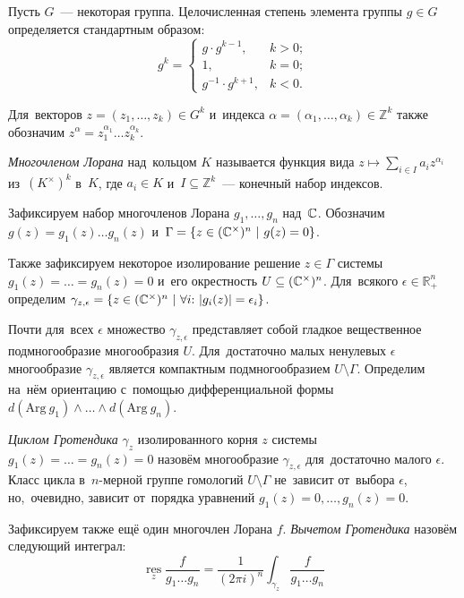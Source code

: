 \documentclass{article}
\begin{document}
Пусть $G$~— некоторая группа. Целочисленная степень элемента группы $g \in G$ определяется стандартным образом:
$$
  g^k =
  \begin{cases}
    g \cdot g^{k - 1}, & k > 0; \\
    1, & k = 0; \\
    g^{-1} \cdot g^{k + 1}, & k < 0.
  \end{cases}
$$

Для~векторов $z = (z_1, \ldots, z_k) \in G^k$ и~индекса $\alpha = (\alpha_1, \ldots, \alpha_k) \in \mathbb{Z}^k$
также обозначим $z^\alpha = z_1^{\alpha_1} \ldots z_k^{\alpha_k}$.

\textit{Многочленом Лорана} над~кольцом $K$ называется функция вида $z \mapsto \sum_{i \in I} a_i z^{\alpha_i}$ из~$(K^\times)^k$ в~$K$,
где $a_i \in K$ и~$I \subseteq \mathbb{Z}^k$~— конечный набор индексов.

Зафиксируем набор многочленов Лорана $g_1, \ldots, g_n$ над~$\mathbb{C}$.
Обозначим $g(z) = g_1(z) \ldots g_n(z)$ и~$\Gamma = \{ z \in (\complex^\times)^n \ | \ g(z) = 0 \}$.

Также зафиксируем некоторое изолирование решение $z \in \Gamma$ системы $g_1(z) = \ldots = g_n(z) = 0$ и~его окрестность $U \subseteq (\mathbb{C}^\times)^n$.
Для~всякого $\epsilon \in \mathbb{R}_{+}^n$ определим $\gamma_{z, \epsilon} = \{ z \in (\mathbb{C}^\times)^n\ | \ \forall i{:}\ |g_i(z)| = \epsilon_i \}$.

Почти для~всех $\epsilon$ множество $\gamma_{z, \epsilon}$ представляет собой гладкое вещественное подмногообразие многообразия $U$.
Для~достаточно малых ненулевых $\epsilon$ многообразие $\gamma_{z, \epsilon}$ является компактным подмногообразием $U \setminus \Gamma$.
Определим на~нём ориентацию с~помощью дифференциальной формы $d(\mathrm{Arg}\ g_1) \wedge \ldots \wedge d(\mathrm{Arg}\ g_n)$.

\textit{Циклом Гротендика} $\gamma_z$ \cite{GelKho02} изолированного корня $z$ системы $g_1(z) = \ldots = g_n(z) = 0$ назовём многообразие $\gamma_{z, \epsilon}$ для~достаточно малого $\epsilon$.
Класс цикла в~$n$-мерной группе гомологий $U \setminus \Gamma$ не~зависит от~выбора $\epsilon$, но,~очевидно, зависит от~порядка уравнений $g_1(z) = 0, \ldots, g_n(z) = 0$.

Зафиксируем также ещё один многочлен Лорана $f$. \textit{Вычетом Гротендика} назовём следующий интеграл:
$$
  \operatorname*{res}\limits_{z} \frac{f}{g_1 \ldots g_n} = \frac{1}{(2 \pi i)^n} \int_{\gamma_z} \frac{f}{g_1 \ldots g_n}
$$
\end{document}
